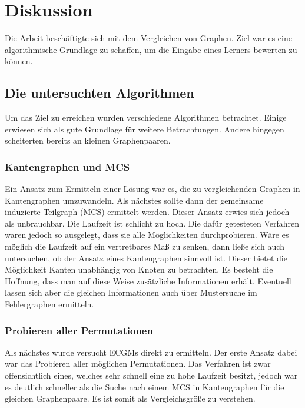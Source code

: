 \chapter{Diskussion}

Die Arbeit beschäftigte sich mit dem Vergleichen von Graphen. Ziel war es 
eine algorithmische Grundlage zu schaffen, um die Eingabe eines Lerners 
bewerten zu können. 

\section{Die untersuchten Algorithmen}
Um das Ziel zu erreichen wurden verschiedene Algorithmen betrachtet. 
Einige erwiesen sich als gute Grundlage für weitere Betrachtungen. Andere 
hingegen scheiterten bereits an kleinen Graphenpaaren.


\subsection{Kantengraphen und MCS}
Ein Ansatz zum Ermitteln einer Lösung war es, die zu vergleichenden 
Graphen in Kantengraphen umzuwandeln. Als nächstes sollte dann der 
gemeinsame induzierte Teilgraph (MCS) ermittelt werden. Dieser Ansatz 
erwies sich jedoch als unbrauchbar. Die Laufzeit ist schlicht zu hoch. Die 
dafür getesteten Verfahren waren jedoch so ausgelegt, dass sie alle 
Möglichkeiten durchprobieren. Wäre es möglich die Laufzeit auf ein 
vertretbares Maß zu senken, dann ließe sich auch untersuchen, ob der 
Ansatz eines Kantengraphen sinnvoll ist. Dieser bietet die Möglichkeit 
Kanten unabhängig von Knoten zu betrachten. Es besteht die Hoffnung, dass 
man auf diese Weise zusätzliche Informationen erhält. Eventuell lassen 
sich aber die gleichen Informationen auch über Mustersuche im Fehlergraphen 
ermitteln.


\subsection{Probieren aller Permutationen}
Als nächstes wurde versucht ECGMs direkt zu ermitteln. Der erste Ansatz 
dabei war das Probieren aller möglichen Permutationen. Das Verfahren 
ist zwar offensichtlich eines, welches sehr schnell eine zu hohe 
Laufzeit besitzt, jedoch war es deutlich schneller als die Suche nach 
einem MCS in Kantengraphen für die gleichen Graphenpaare. Es ist somit 
als Vergleichsgröße zu verstehen.


